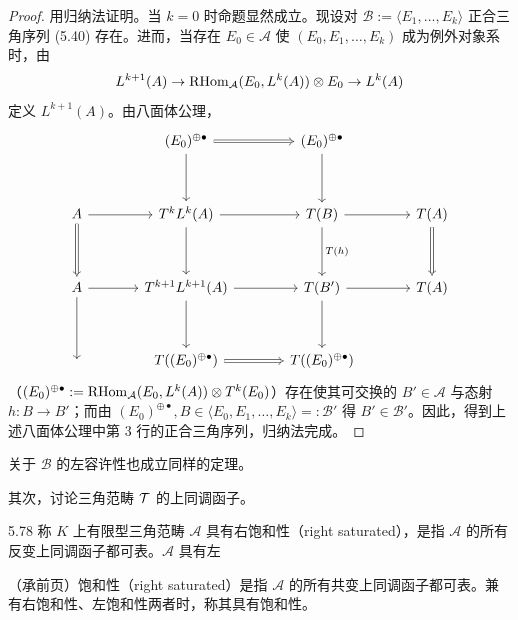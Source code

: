 \begin{proof}
用归纳法证明。当 $k = 0$ 时命题显然成立。现设对 $\mathcal{B} := \langle E_{1},\ldots,E_{k}\rangle$ 正合三角序列 (5.40) 存在。进而，当存在 $E_{0} \in \mathcal{A}$ 使 $(E_{0},E_{1},\ldots,E_{k})$ 成为例外对象系时，由
\[
  L^{k+1}(A) \to \operatorname{RHom}_{\mathcal{A}}(E_{0},L^{k}(A))\otimes E_{0} \to L^{k}(A)
\]
定义 $L^{k+1}(A)$。由八面体公理，
\[
\begin{tikzcd}[row sep=3.4em, column sep=3.6em]
  & (E_{0})^{\oplus\bullet} \arrow[d] \arrow[r, Rightarrow] & (E_{0})^{\oplus\bullet} \arrow[d] & \\
  A \arrow[r] \arrow[d, Rightarrow] & T^{k}L^{k}(A) \arrow[r] \arrow[d] & T(B) \arrow[r] \arrow[d,"T(h)"] & T(A) \arrow[d, Rightarrow]\\
  A \arrow[r] \arrow[d] & T^{k+1}L^{k+1}(A) \arrow[r] \arrow[d] & T(B') \arrow[r] \arrow[d] & T(A)\\
  {} & T((E_{0})^{\oplus\bullet}) \arrow[r, Rightarrow] & T((E_{0})^{\oplus\bullet}) & {}
\end{tikzcd}
\]
（$(E_{0})^{\oplus\bullet} := \operatorname{RHom}_{\mathcal{A}}(E_{0},L^{k}(A))\otimes T^{k}(E_{0})$）存在使其可交换的 $B' \in \mathcal{A}$ 与态射 $h \colon B \to B'$；而由 $(E_{0})^{\oplus\bullet}, B \in \langle E_{0},E_{1},\ldots,E_{k}\rangle =: \mathcal{B}'$ 得 $B' \in \mathcal{B}'$。因此，得到上述八面体公理中第 3 行的正合三角序列，归纳法完成。
\end{proof}


关于 $\mathcal{B}$ 的左容许性也成立同样的定理。

其次，讨论三角范畴 $\mathcal{T}$ 的上同调函子。

\begin{definition}{5.78} 称 $K$ 上有限型三角范畴 $\mathcal{A}$ 具有右饱和性（right saturated），是指 $\mathcal{A}$ 的所有反变上同调函子都可表。$\mathcal{A}$ 具有左

（承前页）饱和性（right saturated）是指 $\mathcal{A}$ 的所有共变上同调函子都可表。兼有右饱和性、左饱和性两者时，称其具有饱和性。\end{definition}

